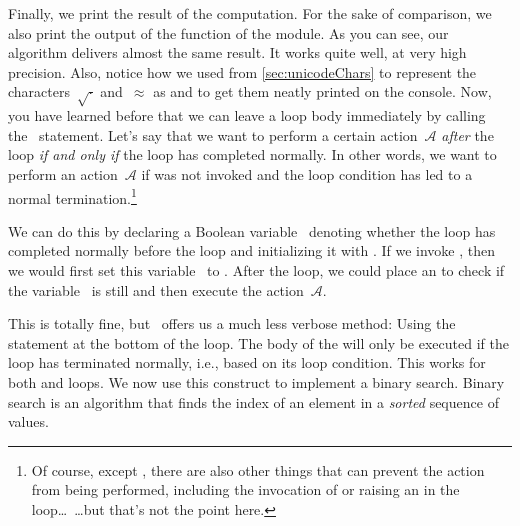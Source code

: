 %
Finally, we print the result of the computation.
For the sake of comparison, we also print the output of the  function of the  module.
As you can see, our algorithm delivers almost the same result.
It works quite well, at very high precision.
Also, notice how we used   from \cref{sec:unicodeChars} to represent the characters~$\sqrt{\cdot}$ and~$\approx$ as  and  to get them neatly printed on the console.%
%
\FloatBarrier%
\endhsection%
%
%
%
\label{sec:loopElse}%
%
Now, you have learned before that we can leave a loop body immediately by calling the~ statement.
Let's say that we want to perform a certain action~$\mathcal{A}$ \emph{after} the loop \emph{if and only if} the loop has completed normally.
In other words, we want to perform an action~$\mathcal{A}$ if  was not invoked and the loop condition has led to a normal termination.\footnote{%
Of course, except , there are also other things that can prevent the action from being performed, including the invocation of  or raising an  in the loop\dots\ {\dots}but that's not the point here.%
}

We can do this by declaring a Boolean variable~ denoting whether the loop has completed normally before the loop and initializing it with .
If we invoke , then we would first set this variable~ to .
After the loop, we could place an  to check if the variable~ is still  and then execute the action~$\mathcal{A}$.

This is totally fine, but \python\ offers us a much less verbose method:
Using the  statement at the bottom of the loop.
The body of the  will only be executed if the loop has terminated normally, i.e., based on its loop condition.
This works for both  and  loops\cite{PSF:P3D:TPT:MCFT}.%
%
%
%
%
%
%
%
We now use this construct to implement a binary search.
Binary search is an algorithm that finds the index of an element in a \emph{sorted} sequence  of values.

